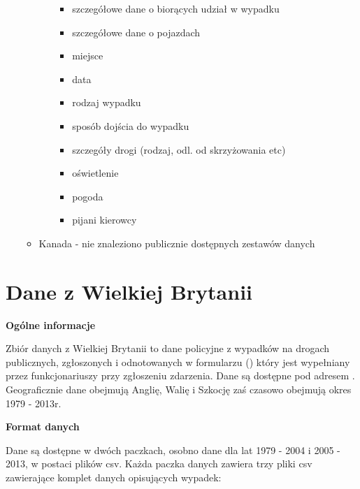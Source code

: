 \begin{enumerate}
\begin{itemize}
\begin{itemize}
      \begin{itemize}
      \itemsep-14pt\parskip0pt
      \item
        szczegółowe dane o biorących udział w wypadku\\
      \item
        szczegółowe dane o pojazdach\\
      \item
        miejsce\\
      \item
        data\\
      \item
        rodzaj wypadku\\
      \item
        sposób dojścia do wypadku\\
      \item
        szczegóły drogi (rodzaj, odl. od skrzyżowania etc)\\
      \item
        oświetlenie\\
      \item
        pogoda\\
      \item
        pijani kierowcy\\
      \end{itemize}
    \end{itemize}
  \item
    Kanada - nie znaleziono publicznie dostępnych zestawów danych
  \end{itemize}
\end{enumerate}

\section{Dane z Wielkiej Brytanii}\label{dane-z-wielkiej-brytanii}

\textbf{Ogólne informacje}

Zbiór danych z Wielkiej Brytanii to dane policyjne z wypadków na drogach
publicznych, zgłoszonych i odnotowanych w formularzu (\cite{formularz}) który jest wypełniany przez funkcjonariuszy przy zgłoszeniu
zdarzenia. Dane są dostępne pod adresem \cite{wb}.
Geograficznie dane obejmują Anglię, Walię i Szkocję zaś czasowo obejmują
okres 1979 - 2013r.

\textbf{Format danych}

Dane są dostępne w dwóch paczkach, osobno dane dla lat 1979 - 2004 i
2005 - 2013, w postaci plików csv. Każda paczka danych zawiera trzy
pliki csv zawierające komplet danych opisujących wypadek:

